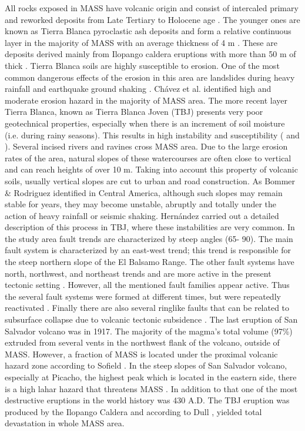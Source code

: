 \documentclass[11pt,twoside]{rmta2010eng}%
\begin{document}
All rocks exposed in MASS have volcanic origin and consist of intercaled primary and reworked deposits from Late Tertiary to Holocene age \cite{schmidt1975}. The younger ones are known as Tierra Blanca pyroclastic ash deposits and form a relative continuous layer in the majority of MASS with an average thickness of 4 m \cite{schmidt1975}. These are deposits derived mainly from Ilopango caldera eruptions with more than 50 m of thick \cite{schmidt1975}. Tierra Blanca soils are highly susceptible to erosion. One of the most common dangerous effects of the erosion in this area are landslides during heavy rainfall and earthquake ground shaking \cite{schmidt1975}. Ch\'{a}vez et al. \cite{chavez2014a} identified high and moderate erosion hazard in the majority of MASS area. The more recent layer Tierra Blanca, known as Tierra Blanca Joven (TBJ) \cite{hernan2004} presents very poor geotechnical properties, especially when there is an increment of soil moisture (i.e. during rainy seasons). This results in high instability and susceptibility (\cite{chavez2014b} and \cite{rolo2004}). Several incised rivers and ravines cross MASS area. Due to the large erosion rates of the area, natural slopes of these watercourses are often close to vertical and can reach heights of over 10 m. Taking into account this property of volcanic soils, usually vertical slopes are cut to urban and road construction. As Bommer \& Rodriguez \cite{bommer} identified in Central America, although such slopes may remain stable for years, they may become unstable, abruptly and totally under the action of heavy rainfall or seismic shaking. Hern\'{a}ndez \cite{hernan2004} carried out a detailed description of this process in TBJ, where these instabilities are very common. 
In the study area fault trends are characterized by steep angles (65\textdegree - 90\textdegree). The main fault system is characterized by an east-west trend; this trend is responsible for the steep northern slope of the El Balsamo Range. The other fault systems have north, northwest, and northeast trends and are more active in the present tectonic setting \cite{schmidt1975}. However, all the mentioned fault families appear active. Thus the several fault systems were formed at different times, but were repeatedly reactivated \cite{rymer1987}. Finally there are also several ringlike faults that can be related to subsurface collapse due to volcanic tectonic subsidence \cite{schmidt1975}. The last eruption of San Salvador volcano was in 1917.  The majority of the magma's total volume (97\%) extruded from several vents in the northwest flank of the volcano, outside of MASS. However, a fraction of MASS is located under the proximal volcanic hazard zone according to Sofield \cite{sofield2004}. In the steep slopes of San Salvador volcano, especially at Picacho, the highest peak which is located in the eastern side, there is a high lahar hazard that threatens MASS \cite{major2004}. In addition to that one of the most destructive eruptions in the world history was 430 A.D. The TBJ eruption was produced by the Ilopango Caldera and  according to Dull \cite{dull2004}, yielded total devastation in whole MASS area. 
\end{document}

